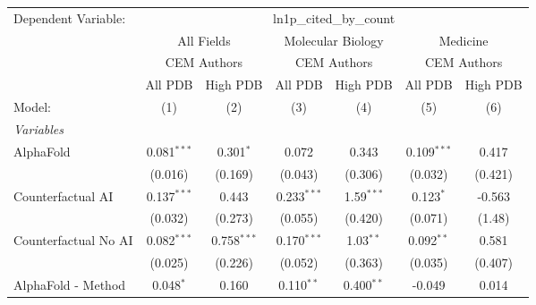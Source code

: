 \begingroup
\centering
\begin{tabular}{lcccccc}
   \tabularnewline \midrule \midrule
   Dependent Variable: & \multicolumn{6}{c}{ln1p\_cited\_by\_count}\\
 & \multicolumn{2}{c}{All Fields} & \multicolumn{2}{c}{Molecular Biology} & \multicolumn{2}{c}{Medicine} \\
\cmidrule(lr){2-3} \cmidrule(lr){4-5} \cmidrule(lr){6-7}
 & \multicolumn{2}{c}{CEM Authors} & \multicolumn{2}{c}{CEM Authors} & \multicolumn{2}{c}{CEM Authors} \\
\cmidrule(lr){2-3} \cmidrule(lr){4-5} \cmidrule(lr){6-7}
 & \multicolumn{1}{c}{All PDB} & \multicolumn{1}{c}{High PDB} & \multicolumn{1}{c}{All PDB} & \multicolumn{1}{c}{High PDB} & \multicolumn{1}{c}{All PDB} & \multicolumn{1}{c}{High PDB} \\
\cmidrule(lr){2-2} \cmidrule(lr){3-3} \cmidrule(lr){4-4} \cmidrule(lr){5-5} \cmidrule(lr){6-6} \cmidrule(lr){7-7}
   Model:                                                     & (1)           & (2)           & (3)            & (4)          & (5)           & (6)\\  
   \midrule
   \emph{Variables}\\
   AlphaFold                                                  & 0.081$^{***}$ & 0.301$^{*}$   & 0.072          & 0.343        & 0.109$^{***}$ & 0.417\\   
                                                              & (0.016)       & (0.169)       & (0.043)        & (0.306)      & (0.032)       & (0.421)\\   
   Counterfactual AI                                          & 0.137$^{***}$ & 0.443         & 0.233$^{***}$  & 1.59$^{***}$ & 0.123$^{*}$   & -0.563\\   
                                                              & (0.032)       & (0.273)       & (0.055)        & (0.420)      & (0.071)       & (1.48)\\   
   Counterfactual No AI                                       & 0.082$^{***}$ & 0.758$^{***}$ & 0.170$^{***}$  & 1.03$^{**}$  & 0.092$^{**}$  & 0.581\\   
                                                              & (0.025)       & (0.226)       & (0.052)        & (0.363)      & (0.035)       & (0.407)\\   
   AlphaFold - Method                                         & 0.048$^{*}$   & 0.160         & 0.110$^{**}$   & 0.400$^{**}$ & -0.049        & 0.014\\   

\end{tabular}
